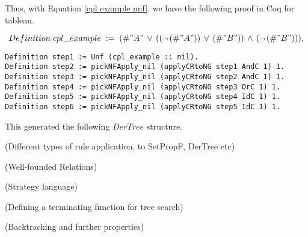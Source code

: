 \documentclass{article}
\newcommand{\eref}[1]{Equation \ref{#1}}
\begin{document}
Thus, with \eref{cpl example nnf}, we have the following proof in Coq for
tableau.

$$
Definition\; cpl\_example\; :=\; (\#"A"\, \vee\, ((\neg\, (\#"A"))\, \vee\, (\# "B"))\, \wedge\, (\neg\, (\# "B"))).
$$

\begin{lstlisting}
Definition step1 := Unf (cpl_example :: nil).
Definition step2 := pickNFApply_nil (applyCRtoNG step1 AndC 1) 1.
Definition step3 := pickNFApply_nil (applyCRtoNG step2 AndC 1) 1.
Definition step4 := pickNFApply_nil (applyCRtoNG step3 OrC 1) 1.
Definition step5 := pickNFApply_nil (applyCRtoNG step4 IdC 1) 1.
Definition step6 := pickNFApply_nil (applyCRtoNG step5 IdC 1) 1.
\end{lstlisting}

This generated the following $DerTree$ structure.

\newpage

(Different types of rule application, to SetPropF, DerTree etc)

(Well-founded Relations)

(Strategy language)

(Defining a terminating function for tree search)

(Backtracking and further properties)
\end{document}
